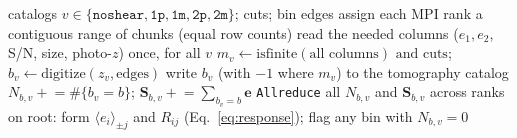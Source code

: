 \documentclass{article}
\begin{document}
\begin{algorithm}[t]
\caption{Chunked source selection with response accumulation}\label{alg:select}
\small
\begin{algorithmic}[1]
\Require catalogs $v\in\{\texttt{noshear},\texttt{1p},\texttt{1m},\texttt{2p},\texttt{2m}\}$; cuts; bin edges
\State assign each MPI rank a contiguous range of chunks (equal row counts)
  \State read the needed columns ($e_1,e_2$, S/N, size, photo-$z$) once, for all $v$
    \State $m_v \gets \mathrm{isfinite}(\text{all columns}) \text{ and } \text{cuts}$; \quad $b_v \gets \mathrm{digitize}(z_v,\text{edges})$
    \State write $b_v$ (with $-1$ where  $m_v$) to the tomography catalog
      \State $N_{b,v} \mathrel{+}= \#\{b_v = b\}$; \quad $\mathbf{S}_{b,v} \mathrel{+}= \sum_{b_v=b}\mathbf{e}$
    \EndFor
  \EndFor
\EndFor
\State \texttt{Allreduce} all $N_{b,v}$ and $\mathbf{S}_{b,v}$ across ranks
\State on root: form $\langle e_i\rangle_{\pm j}$ and $R_{ij}$ (Eq.~\ref{eq:response}); flag any bin with $N_{b,v}=0$
\end{algorithmic}
\end{algorithm}

{\footnotesize
\setlength{\bibsep}{2pt}


}
\end{document}
